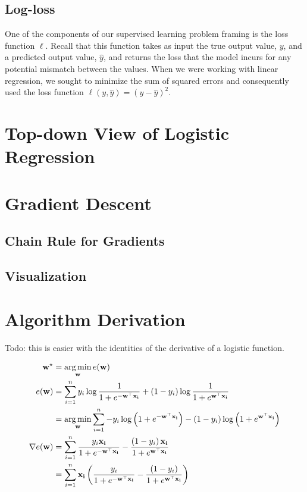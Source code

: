 \documentclass[assignment03_Solutions]{subfiles}
\begin{document}
\subsection{Log-loss}

One of the  components of our supervised learning problem framing is the loss function $\ell$.  Recall that this function takes as input the true output value, $y$, and a predicted output value, $\hat{y}$, and returns the loss that the model incurs for any potential mismatch between the values.  When we were working with linear regression, we sought to minimize the sum of squared errors and consequently used the loss function $\ell(y, \hat{y}) = (y-\hat{y})^2$.



\section{Top-down View of Logistic Regression}


\section{Gradient Descent}

\subsection{Chain Rule for Gradients}


\subsection{Visualization}

\section{Algorithm Derivation}

Todo: this is easier with the identities of the derivative of a logistic function.

\begin{align}
\mathbf{w^\star} &= \operatorname*{arg\,min}_{\mathbf{w}} e(\mathbf{w}) \\
e(\mathbf{w}) &= \sum_{i=1}^n y_i \log \frac{1}{1 + e^{-\mathbf{w}^\top \mathbf{x_i}}} +  (1-y_i) \log \frac{1}{1 + e^{\mathbf{w}^\top \mathbf{x_i}}} \\
&= \operatorname*{arg\,min}_{\mathbf{w}} \sum_{i=1}^n -y_i \log \left ( 1 + e^{-\mathbf{w}^\top \mathbf{x_i}} \right) -  (1-y_i) \log \left ( 1 + e^{\mathbf{w}^\top \mathbf{x_i}} \right) \\
\nabla e(\mathbf{w}) &= \sum_{i=1}^n \frac{y_i \mathbf{x_i}}{1 + e^{-\mathbf{w}^\top \mathbf{x_i}}} - \frac{\left ( 1 - y_i \right) \mathbf{x_i}}{1 + e^{\mathbf{w}^\top \mathbf{x_i}} } \\
&= \sum_{i=1}^n \mathbf{x_i} \left ( \frac{y_i }{1 + e^{-\mathbf{w}^\top \mathbf{x_i}}} - \frac{\left ( 1 - y_i \right) }{1 + e^{\mathbf{w}^\top \mathbf{x_i}} } \right)
\end{align}
\end{document}
